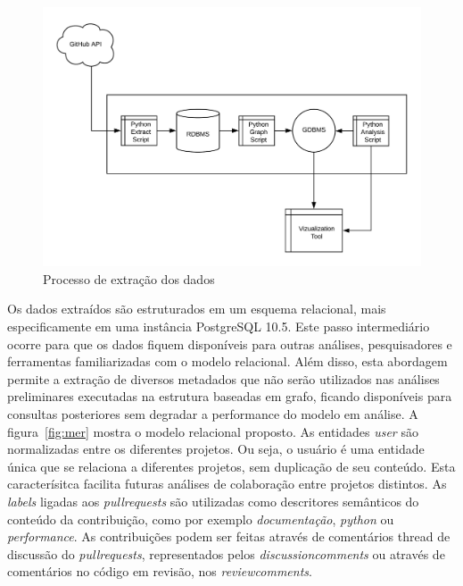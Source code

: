 \documentclass[sigconf]{acmart}
\begin{document}
\begin{figure}[!htbp]
 \includegraphics[width=\columnwidth]{processo_extracao}
 \caption{Processo de extração dos dados}\label{fig:processo_extracao}
\end{figure}

Os dados extraídos são estruturados em um esquema relacional, mais especificamente em uma instância PostgreSQL 10.5. Este passo intermediário ocorre para que os dados fiquem disponíveis para outras análises, pesquisadores e ferramentas familiarizadas com o modelo relacional. Além disso, esta abordagem permite a extração de diversos metadados que não serão utilizados nas análises preliminares executadas na estrutura baseadas em grafo, ficando disponíveis para consultas posteriores sem degradar a performance do modelo em análise. A figura~\ref{fig:mer} mostra o modelo relacional proposto. As entidades \textit{user} são normalizadas entre os diferentes projetos. Ou seja, o usuário é uma entidade única que se relaciona a diferentes projetos, sem duplicação de seu conteúdo. Esta caracterísitca facilita futuras análises de colaboração entre projetos distintos. As \textit{labels} ligadas aos \textit{pullrequests} são utilizadas como descritores semânticos do conteúdo da contribuição, como por exemplo \textit{documentação}, \textit{python} ou \textit{performance}. As contribuições podem ser feitas através de comentários thread de discussão do \textit{pullrequests}, representados pelos \textit{discussioncomments} ou através de comentários no código em revisão, nos \textit{reviewcomments}.
\end{document}
